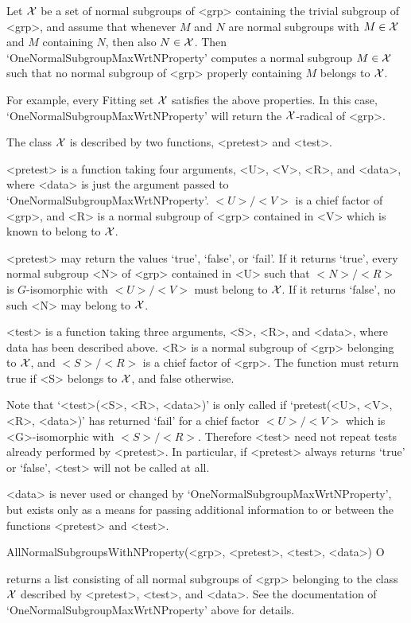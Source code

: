Let $\cal X$ be a set of normal subgroups of <grp> containing the trivial
subgroup of <grp>, and assume that whenever
$M$ and $N$ are normal subgroups with $M \in \cal X$ and $M$
containing $N$, then also $N \in \cal X$. Then
`OneNormalSubgroupMaxWrtNProperty' computes a normal subgroup $M \in \cal X$
such that no normal subgroup of <grp> properly containing $M$ belongs to $\cal
X$. 

For example, every Fitting set $\cal X$ satisfies the above properties. In
this case, `OneNormalSubgroupMaxWrtNProperty' will return the $\cal
X$-radical of <grp>.

The class $\cal X$ is described by two functions, <pretest> and <test>. 

<pretest> is a function taking four arguments, <U>, <V>, <R>, and <data>,
where <data> is just the argument passed to
`OneNormalSubgroupMaxWrtNProperty'. $<U>/<V>$ is a chief factor of <grp>,
and  <R> is a normal subgroup of <grp> contained in <V> which is known to
belong to
$\cal X$.

<pretest> may return the values `true', `false', or `fail'. If it returns 
`true', every normal subgroup <N> of <grp> contained in <U> such that
$<N>/<R>$ is 
$G$-isomorphic with $<U>/<V>$ must belong to $\cal X$. If it returns `false',
no such <N> may belong to $\cal X$. 

<test> is a function taking three arguments, <S>, <R>, and <data>, where
data has been described above. <R> is a normal subgroup of <grp> belonging to
$\cal X$, and $<S>/<R>$ is a chief factor of <grp>. The function must return
true if <S> belongs to $\cal X$, and false otherwise. 

Note that `<test>(<S>, <R>, <data>)' is only called if `pretest(<U>, <V>,
<R>, <data>)' has returned `fail' for a chief factor $<U>/<V>$ which is
<G>-isomorphic with $<S>/<R>$. Therefore <test> need not repeat tests
already performed by <pretest>. In particular, if <pretest> always returns
`true' or `false', <test> will not be called at all.

<data> is never used or changed by `OneNormalSubgroupMaxWrtNProperty', but
exists only as a means for passing additional information to or between
the functions <pretest> and <test>.


\>AllNormalSubgroupsWithNProperty(<grp>, <pretest>, <test>, <data>) O

returns a list consisting of all normal subgroups of <grp> belonging 
to the class $\cal X$ described by <pretest>, <test>, and <data>. See
the documentation of `OneNormalSubgroupMaxWrtNProperty' above for details.

